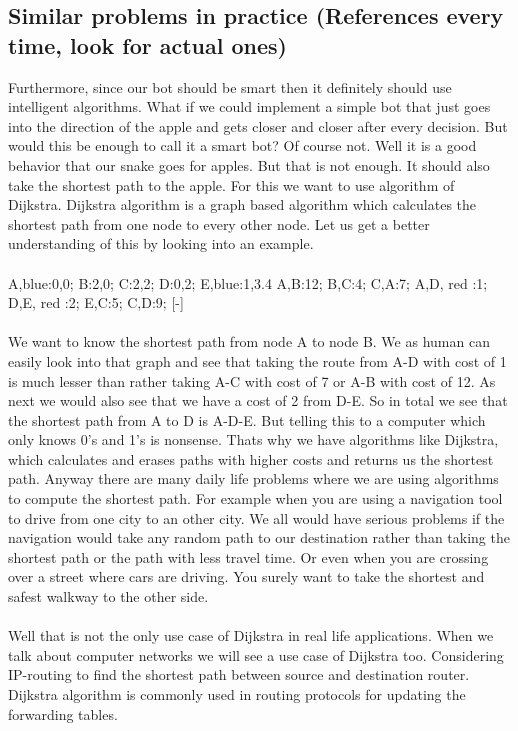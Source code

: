 \documentclass[a4paper,12pt]{article}
\begin{document}
\subsection{Similar problems in practice (References every time, look for actual ones)}
Furthermore, since our bot should be smart then it definitely should use intelligent algorithms. What if we could implement a simple bot that just goes into the direction of the apple and gets closer and closer after every decision. But would this be enough to call it a smart bot? Of course not. Well it is a good behavior that our snake goes for apples.  But that is not enough. It should also take the shortest path to the apple. For this we want to use algorithm of Dijkstra. Dijkstra algorithm is a graph based algorithm which calculates the shortest path from one node to every other node. Let us get a better understanding of this by looking into an example.\\
\\
{
A,blue:0,0;
B:2,0;
C:2,2;
D:0,2;
E,blue:1,3.4
}
{
A,B:12;
B,C:4;
C,A:7; 
A,D, red :1;
D,E, red :2; 
E,C:5;
C,D:9;
}[-]
\mygraph{}
\\
\\We want to know the shortest path from node A to node B. We as human can easily look into that graph and see that taking the route from A-D with cost of 1 is much lesser than rather taking A-C with cost of 7 or A-B with cost of 12. As next we would also see that we have a cost of 2 from D-E. So in total we see that the shortest path from A to D is A-D-E. But telling this to a computer which only knows 0's and 1's is nonsense. Thats why we have algorithms like Dijkstra, which calculates and erases paths with higher costs and returns us the shortest path. Anyway there are many daily life problems where we are using algorithms to compute the shortest path. For example when you are using a navigation tool to drive from one city to an other city. We all would have serious problems if the navigation would take any random path to our destination rather than taking the shortest path or the path with less travel time. Or even when you are crossing over a street where cars are driving. You surely want to take the shortest and safest walkway to the other side.\\
\\Well that is not the only use case of Dijkstra in real life applications. When we talk about computer networks we will see a use case of Dijkstra too. Considering IP-routing to find the shortest path between source and destination router. Dijkstra algorithm is commonly used in routing protocols for updating the forwarding tables.\\
\end{document}
